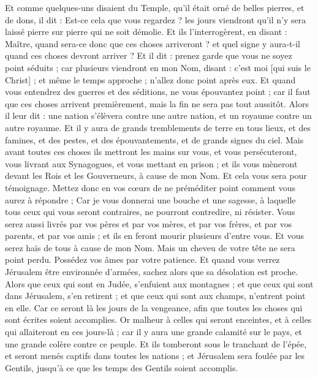 \begin{multicols}{2}
Et comme quelques-uns disaient du Temple, qu'il était orné de belles pierres, et de dons, il dit :
Est-ce cela que vous regardez ? les jours viendront qu'il n'y sera laissé pierre sur pierre qui ne soit démolie.
Et ils l'interrogèrent, en disant : Maître, quand sera-ce donc que ces choses arriveront ? et quel signe y aura-t-il quand ces choses devront arriver ?
Et il dit : prenez garde que vous ne soyez point séduits ; car plusieurs viendront en mon Nom, disant : c'est moi [qui suis le Christ] ; et même le temps approche ; n'allez donc point après eux.
Et quand vous entendrez des guerres et des séditions, ne vous épouvantez point ; car il faut que ces choses arrivent premièrement, mais la fin ne sera pas tout aussitôt.
Alors il leur dit : une nation s'élèvera contre une autre nation, et un royaume contre un autre royaume.
Et il y aura de grands tremblements de terre en tous lieux, et des famines, et des pestes, et des épouvantements, et de grands signes du ciel.
Mais avant toutes ces choses ils mettront les mains sur vous, et vous persécuteront, vous livrant aux Synagogues, et vous mettant en prison ; et ils vous mèneront devant les Rois et les Gouverneurs, à cause de mon Nom.
Et cela vous sera pour témoignage.
Mettez donc en vos cœurs de ne préméditer point comment vous aurez à répondre ;
Car je vous donnerai une bouche et une sagesse, à laquelle tous ceux qui vous seront contraires, ne pourront contredire, ni résister.
Vous serez aussi livrés par vos pères et par vos mères, et par vos frères, et par vos parents, et par vos amis ; et ils en feront mourir plusieurs d'entre vous.
Et vous serez haïs de tous à cause de mon Nom.
Mais un cheveu de votre tête ne sera point perdu.
Possédez vos âmes par votre patience.
Et quand vous verrez Jérusalem être environnée d'armées, sachez alors que sa désolation est proche.
Alors que ceux qui sont en Judée, s'enfuient aux montagnes ; et que ceux qui sont dans Jérusalem, s'en retirent ; et que ceux qui sont aux champs, n'entrent point en elle.
Car ce seront là les jours de la vengeance, afin que toutes les choses qui sont écrites soient accomplies.
Or malheur à celles qui seront enceintes, et à celles qui allaiteront en ces jours-là ; car il y aura une grande calamité sur le pays, et une grande colère contre ce peuple.
Et ils tomberont sous le tranchant de l'épée, et seront menés captifs dans toutes les nations ; et Jérusalem sera foulée par les Gentils, jusqu'à ce que les temps des Gentils soient accomplis.

\end{multicols}
